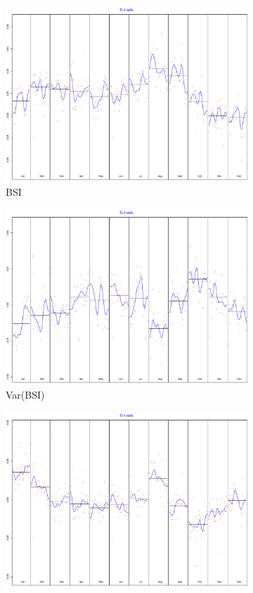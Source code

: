 \documentclass[12pt,a4paper,oneside]{book}
\begin{document}
\begin{figure}
\begin{subfigure}{.5\textwidth}
  \centering
  \includegraphics[width=.8\linewidth]{Graphs/S-I_1.pdf}
  \caption{BSI}
\end{subfigure}%
\begin{subfigure}{.5\textwidth}
  \centering
  \includegraphics[width=.8\linewidth]{Graphs/S-I_2.pdf}
  \caption{Var(BSI)}
\end{subfigure}
\begin{subfigure}{.5\textwidth}
  \centering
  \includegraphics[width=.8\linewidth]{Graphs/S-I_3.pdf}

\end{subfigure}
\end{figure}
\end{document}

